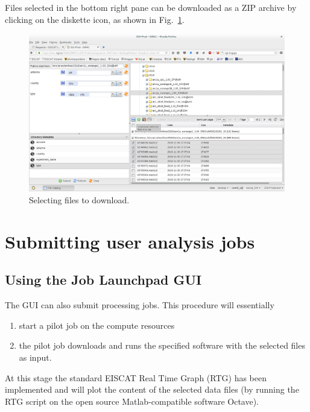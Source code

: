 \documentclass[a4paper]{article}
\begin{document}
Files selected in the bottom right pane can be downloaded as a ZIP
archive by clicking on the diskette icon, as shown in
Fig.~\ref{fig:download}.
\begin{figure}[htb]
  \centering
  \includegraphics[width=1.0\linewidth]{dirac-gui-download}
  \caption{Selecting files to download.}
  \label{fig:download}
\end{figure}

\section{Submitting user analysis jobs}
\label{sec:rtg}

\subsection{Using the Job Launchpad GUI}
\label{sec:using-job-launchpad}

The GUI can also submit processing jobs. This procedure will essentially

\begin{enumerate}
\item start a pilot job on the compute resources

\item the pilot job downloads and runs the specified software with the
  selected files as input.
\end{enumerate}

At this stage the standard EISCAT Real Time Graph (RTG) has been
implemented and will plot the content of the selected data files (by
running the RTG script on the open source Matlab-compatible software
Octave).
\end{document}
